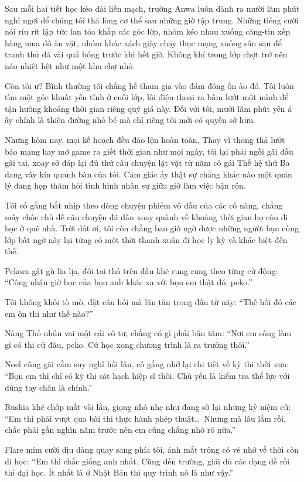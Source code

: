 \documentclass[../main.tex]{subfiles}
\begin{document}
Sau mỗi hai tiết học kéo dài liền mạch, trường Anwa luôn dành ra mười lăm phút nghỉ ngơi để chúng tôi thả lỏng cơ thể sau những giờ tập trung. Những tiếng cười nói ríu rít lập tức lan tỏa khắp các góc lớp, nhóm kéo nhau xuống căng-tin xếp hàng mua đồ ăn vặt, nhóm khác xách giày chạy thục mạng xuống sân sau để tranh thủ đá vài quả bóng trước khi hết giờ. Không khí trong lớp chợt trở nên náo nhiệt hệt như một khu chợ nhỏ.

Còn tôi ư? Bình thường tôi chẳng hề tham gia vào đám đông ồn ào đó. Tôi luôn tìm một góc khuất yên tĩnh ở cuối lớp, lôi điện thoại ra bấm lướt một mình để tận hưởng khoảng thời gian riêng quý giá này. Đối với tôi, mười lăm phút yên ả ấy chính là thiên đường nhỏ bé mà chỉ riêng tôi mới có quyền sở hữu.

Nhưng hôm nay, mọi kế hoạch đều đảo lộn hoàn toàn. Thay vì thong thả lướt báo mạng hay mở game ra giết thời gian như mọi ngày, tôi lại phải ngồi gãi đầu gãi tai, xoay sở đáp lại đủ thứ câu chuyện lặt vặt từ năm cô gái Thế hệ thứ Ba đang vây kín quanh bàn của tôi. Cảm giác ấy thật sự chẳng khác nào một quản lý đang họp thăm hỏi tình hình nhân sự giữa giờ làm việc bận rộn.

Tôi cố gắng bắt nhịp theo dòng chuyện phiếm vô đầu của các cô nàng, chẳng mấy chốc chủ đề câu chuyện đã dần xoay quành về khoảng thời gian họ còn đi học ở quê nhà. Trời đất ơi, tôi còn chẳng bao giờ ngờ được những người bạn cùng lớp bất ngờ này lại từng có một thời thanh xuân đi học ly kỳ và khác biệt đến thế.

Pekora gật gù lia lịa, đôi tai thỏ trên đầu khẽ rung rung theo từng cử động: ``Công nhận giờ học của bọn anh khác xa với bọn em thật đó, peko.''

Tôi không khỏi tò mò, đặt câu hỏi mà lăn tăn trong đầu từ nãy: ``Thế hồi đó các em ôn thi như thế nào?''

Nàng Thỏ nhún vai một cái vô tư, chẳng có gì phải bận tâm: ``Nơi em sống làm gì có thi cử đâu, peko. Cứ học xong chương trình là ra trường thôi.''

Noel cũng gãi cằm suy nghĩ hồi lâu, cố gắng nhớ lại chi tiết về kỳ thi thời xưa: ``Bọn em thì chỉ có kỳ thi sát hạch hiệp sĩ thôi. Chủ yếu là kiểm tra thể lực với dùng tay chân là chính.''

Rushia khẽ chớp mắt vài lần, giọng nhỏ nhẹ như đang sờ lại những kỷ niệm cũ: ``Em thì phải vượt qua bài thi thực hành phép thuật\dots\ Nhưng mà lâu lắm rồi, chắc phải gần nghìn năm trước nên em cũng chẳng nhớ rõ nữa.''

Flare mỉm cười dịu dàng quay sang phía tôi, ánh mắt trông có vẻ nhớ về thời còn đi học: ``Em thì chắc giống anh nhất. Cũng đến trường, giải đủ các dạng đề rồi thi đại học. Ít nhất là ở Nhật Bản thì quy trình nó là như vậy.''
\end{document}
